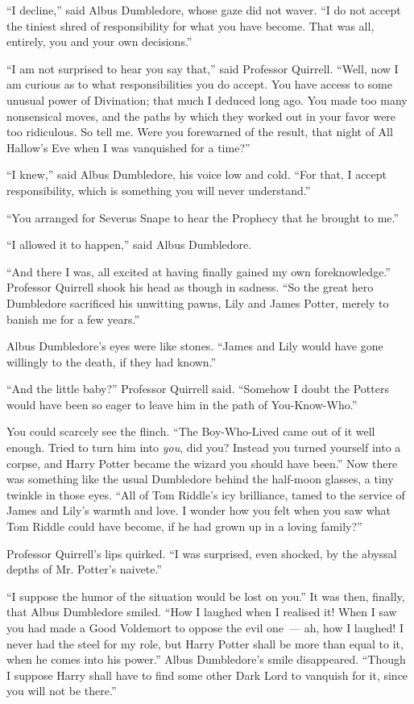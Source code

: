 ``I decline,'' said Albus Dumbledore, whose gaze did not waver. ``I do not accept the tiniest shred of responsibility for what you have become. That was all, entirely, you and your own decisions.''

``I am not surprised to hear you say that,'' said Professor Quirrell. ``Well, now I am curious as to what responsibilities you do accept. You have access to some unusual power of Divination; that much I deduced long ago. You made too many nonsensical moves, and the paths by which they worked out in your favor were too ridiculous. So tell me. Were you forewarned of the result, that night of All Hallow's Eve when I was vanquished for a time?''

``I knew,'' said Albus Dumbledore, his voice low and cold. ``For that, I accept responsibility, which is something you will never understand.''

``You arranged for Severus Snape to hear the Prophecy that he brought to me.''

``I allowed it to happen,'' said Albus Dumbledore.

``And there I was, all excited at having finally gained my own foreknowledge.'' Professor Quirrell shook his head as though in sadness. ``So the great hero Dumbledore sacrificed his unwitting pawns, Lily and James Potter, merely to banish me for a few years.''

Albus Dumbledore's eyes were like stones. ``James and Lily would have gone willingly to the death, if they had known.''

``And the little baby?'' Professor Quirrell said. ``Somehow I doubt the Potters would have been so eager to leave him in the path of You-Know-Who.''

You could scarcely see the flinch. ``The Boy-Who-Lived came out of it well enough. Tried to turn him into \emph{you}, did you? Instead you turned yourself into a corpse, and Harry Potter became the wizard you should have been.'' Now there was something like the usual Dumbledore behind the half-moon glasses, a tiny twinkle in those eyes. ``All of Tom Riddle's icy brilliance, tamed to the service of James and Lily's warmth and love. I wonder how you felt when you saw what Tom Riddle could have become, if he had grown up in a loving family?''

Professor Quirrell's lips quirked. ``I was surprised, even shocked, by the abyssal depths of Mr. Potter's naivete.''

``I suppose the humor of the situation would be lost on you.'' It was then, finally, that Albus Dumbledore smiled. ``How I laughed when I realised it! When I saw you had made a Good Voldemort to oppose the evil one~--- ah, how I laughed! I never had the steel for my role, but Harry Potter shall be more than equal to it, when he comes into his power.'' Albus Dumbledore's smile disappeared. ``Though I suppose Harry shall have to find some other Dark Lord to vanquish for it, since you will not be there.''

